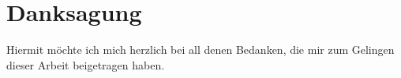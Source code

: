 \chapter*{Danksagung}
Hiermit möchte ich mich herzlich bei all denen Bedanken, die mir zum Gelingen dieser Arbeit beigetragen haben. 